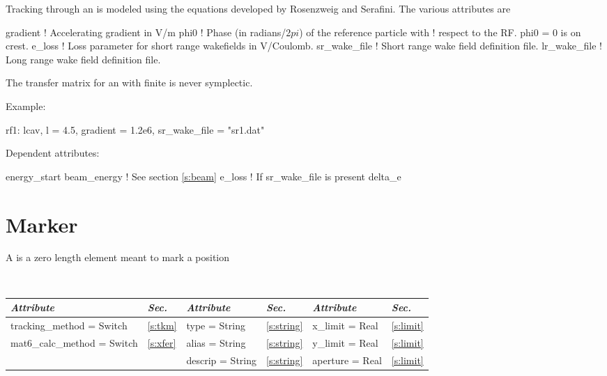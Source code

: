 Tracking through an  is modeled using the equations developed by Rosenzweig
and Serafini\cite{b:rosenzweig}. The various attributes are
\begin{example}
  gradient     ! Accelerating gradient in V/m
  phi0         ! Phase (in radians/2$pi$) of the reference particle with 
               !   respect to the RF. phi0 = 0 is on crest.
  e_loss       ! Loss parameter for short range wakefields in V/Coulomb.
  sr_wake_file ! Short range wake field definition file.
  lr_wake_file ! Long range wake field definition file.
\end{example}

The transfer matrix for an  with finite  is never symplectic.

\vskip0.05in \noindent
Example:
\begin{example}
  rf1: lcav, l = 4.5, gradient = 1.2e6, sr\_wake\_file = "sr1.dat"
\end{example}

\vskip0.05in \noindent
Dependent attributes:
\begin{example}
  energy\_start
  beam\_energy  ! See section \ref{s:beam}
  e\_loss       ! If sr\_wake\_file is present
  delta\_e
\end{example}

\section{Marker}
\label{s:mark}

A  is a zero length element meant to mark a position

\toffset
\begin{center}
\tt
\begin{tabular}{|l|l||l|l||l|l|} \hline
  {\sl Attribute} & {\sl Sec.}  & {\sl Attribute} & {\sl Sec.} & {\sl Attribute} & {\sl Sec.} \\ \hline
  tracking\_method = Switch    & \ref{s:tkm}  &  type = String      & \ref{s:string} & x\_limit = Real  & \ref{s:limit} \\ \hline 
  mat6\_calc\_method = Switch  & \ref{s:xfer} &  alias = String     & \ref{s:string} & y\_limit = Real  & \ref{s:limit} \\ \hline 
                               &              &  descrip = String   & \ref{s:string} & aperture = Real  & \ref{s:limit} \\ \hline 
\end{tabular}
\end{center}
\toffset

